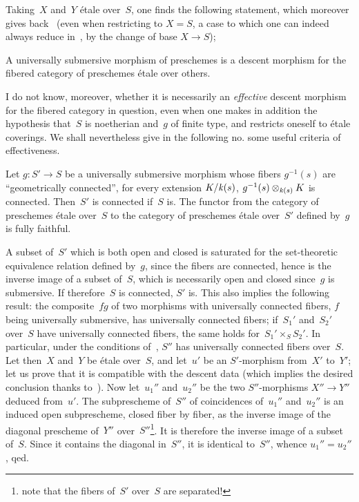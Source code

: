 Taking~$X$ and~$Y$ \'etale over~$S$, one finds the following
statement, which moreover gives back~ (even when
restricting to $X=S$, a case to which one can indeed always
reduce in~, by the change of base $X\to S$);

\begin{corollary}
\label{IX.3.3}
A universally submersive morphism of preschemes is a
descent morphism for the fibered category of
preschemes \'etale over others.
\end{corollary}

I do not know, moreover, whether it is necessarily an
\emph{effective} descent morphism for the fibered category in
question, even when one makes in addition the hypothesis that~$S$ is
noetherian and~$g$ of finite type, and restricts oneself to
\'etale coverings. We shall nevertheless give in the
following no. some useful criteria of effectiveness.

\begin{corollary}
\label{IX.3.4}
Let
$g\colon S'\to S$ be a universally submersive morphism whose
fibers $g^{-1}(s)$ are ``geometrically connected'',
\ie for every extension $K/\mathit{k}(s)$, $g^{-1}(s)\otimes_{\mathit{k}(s)} K$ is
connected. Then~$S'$ is connected if~$S$ is. The functor from the
category of preschemes \'etale over~$S$ to the
category
of preschemes \'etale over~$S'$ defined by~$g$ is
fully faithful.
\end{corollary}

A subset of~$S'$ which is both open and closed is
saturated for the set-theoretic equivalence relation defined
by~$g$, since the fibers are connected, hence is the inverse image
of a subset of~$S$, which is necessarily open and closed
since~$g$ is submersive. If therefore~$S$ is connected, $S'$ is. This
also implies the following result: the composite~$fg$ of two
morphisms with universally connected fibers,
$f$ being universally submersive, has universally
connected fibers; if~$S_1'$ and~$S_2'$ over~$S$ have
universally connected fibers, the same holds for~$S_1'\times_S
S_2'$. In particular, under the conditions of~, $S''$ has
universally connected fibers over~$S$. Let then~$X$ and~$Y$ be
\'etale over~$S$, and let~$u'$ be an $S'$-morphism from~$X'$ to~$Y'$;
let us prove that it is compatible with the descent data (which
implies the desired conclusion thanks to~). Now
let~$u_1''$ and~$u_2''$ be the two $S''$-morphisms $X''\to Y''$
deduced from~$u'$. The subprescheme of~$S''$ of
coincidences of~$u_1''$ and~$u_2''$ is an induced open
subprescheme, closed fiber by fiber, as the inverse image of the
diagonal prescheme of~$Y''$ over~$S''$\kern1pt\footnote{note that the
fibers of~$S'$ over~$S$ are separated!}. It is therefore the inverse
image of a subset of~$S$. Since it contains the diagonal
in~$S''$, it is identical to~$S''$, whence $u_1''=u_2''$,
qed.
